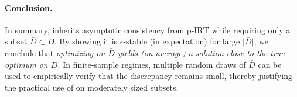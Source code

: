 \paragraph{Conclusion.}
In summary, \mpirt{} inherits asymptotic consistency from \(\mathrm{p\text{-}IRT}\) 
while requiring only a subset \(\bar{D}\subset D\).  By showing it is 
\(\epsilon\)-stable (in expectation) for large \(\lvert \bar{D}\rvert\), we conclude 
that \emph{optimizing on \(\bar{D}\) yields (on average) a solution close to the 
true optimum on \(D\).}  In finite-sample regimes, multiple random draws of 
\(\bar{D}\) can be used to empirically verify that the discrepancy remains small, 
thereby justifying the practical use of \mpirt{} on moderately sized subsets.